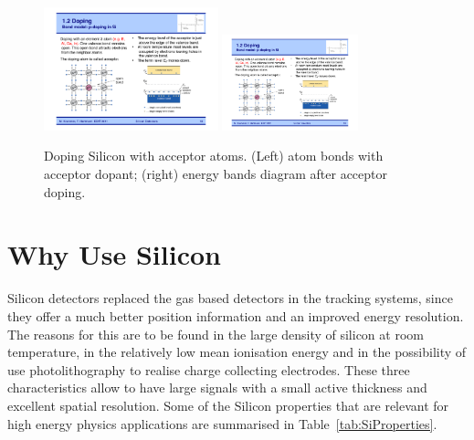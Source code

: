  \begin{figure}[htbp]
   \centering
   \includegraphics[width=0.45\textwidth]{pDopingBonds.pdf} 
   \includegraphics[width=0.35\textwidth]{pDopingBands.pdf} 
   \caption{\label{fig:pDoping}Doping Silicon with acceptor atoms. (Left) atom bonds with acceptor 
   dopant; (right) energy bands diagram after acceptor doping.}
\end{figure}



\section{Why Use Silicon}

Silicon detectors replaced the  gas based detectors in the tracking systems, since they offer a much
 better position information and an improved energy resolution. The reasons for this are to be found 
in the large density of silicon at room temperature, in the relatively low mean ionisation energy and 
in the possibility of use photolithography to realise charge collecting electrodes. 
These three characteristics allow to have large signals with a small active thickness and 
excellent spatial resolution. Some of the Silicon properties that are relevant for high energy 
physics applications are summarised in Table~\ref{tab:SiProperties}.

